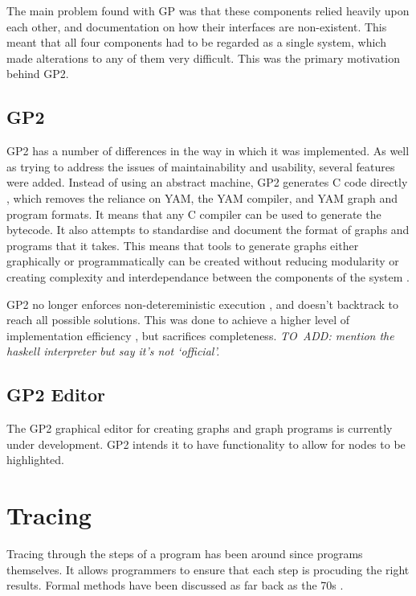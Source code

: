 \documentclass{UoYCSproject}
\begin{document}
The main problem found with GP was that these components relied heavily upon each other, and documentation on how their interfaces are non-existent. %
This meant that all four components had to be regarded as a single system, which made alterations to any of them very difficult. This was the primary motivation behind GP2.

\subsection{GP2}

GP2 has a number of differences in the way in which it was implemented. As well as trying to address the issues of maintainability and usability, several features were added.
Instead of using an abstract machine, GP2 generates C code directly \cite{chris_compiler}, which removes the reliance on YAM, the YAM compiler, and YAM graph and program formats. It means that any C compiler can be used to generate the bytecode. It also attempts to standardise and document the format of graphs and programs that it takes. This means that tools to generate graphs either graphically or programmatically can be created without reducing modularity or creating complexity and interdependance between the components of the system \cite{gp2_ide}. %

GP2 no longer enforces non-detereministic execution \cite[p. 15]{gp2_ide}, and doesn't backtrack to reach all possible solutions. This was done to achieve a higher level of implementation efficiency \cite[p. 15]{chris_compiler}, but sacrifices completeness.
\emph{TO~ADD: mention the haskell interpreter but say it's not `official'.} %

\subsection{GP2 Editor}
The GP2 graphical editor for creating graphs and graph programs is currently under development. GP2 intends it to have functionality to allow for nodes to be highlighted.

\section{Tracing}
Tracing through the steps of a program has been around since programs themselves. %
It allows programmers to ensure that each step is procuding the right results. Formal methods have been discussed as far back as the 70s \cite{psych_debug, code_walkthroughs}.
\end{document}

